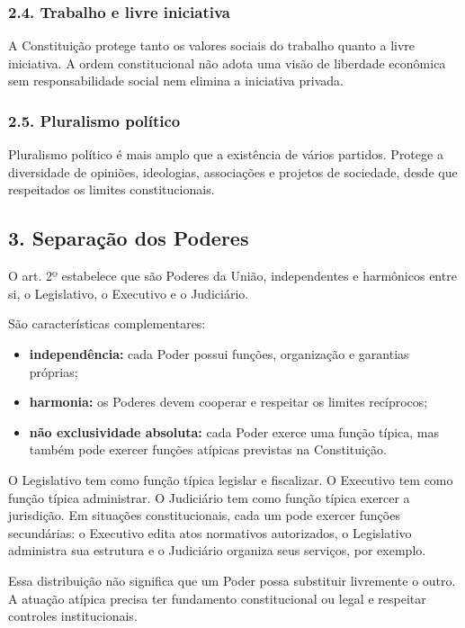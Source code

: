 \documentclass[11pt,a4paper]{article}
\begin{document}
\subsubsection*{2.4. Trabalho e livre iniciativa}

A Constituição protege tanto os valores sociais do trabalho quanto a livre iniciativa. A ordem constitucional não adota uma visão de liberdade econômica sem responsabilidade social nem elimina a iniciativa privada.

\subsubsection*{2.5. Pluralismo político}

Pluralismo político é mais amplo que a existência de vários partidos. Protege a diversidade de opiniões, ideologias, associações e projetos de sociedade, desde que respeitados os limites constitucionais.

\subsection*{3. Separação dos Poderes}

O art. 2º estabelece que são Poderes da União, independentes e harmônicos entre si, o Legislativo, o Executivo e o Judiciário.

São características complementares:

\begin{itemize}
  \item \textbf{independência:} cada Poder possui funções, organização e garantias próprias;
  \item \textbf{harmonia:} os Poderes devem cooperar e respeitar os limites recíprocos;
  \item \textbf{não exclusividade absoluta:} cada Poder exerce uma função típica, mas também pode exercer funções atípicas previstas na Constituição.
\end{itemize}

O Legislativo tem como função típica legislar e fiscalizar. O Executivo tem como função típica administrar. O Judiciário tem como função típica exercer a jurisdição. Em situações constitucionais, cada um pode exercer funções secundárias: o Executivo edita atos normativos autorizados, o Legislativo administra sua estrutura e o Judiciário organiza seus serviços, por exemplo.

Essa distribuição não significa que um Poder possa substituir livremente o outro. A atuação atípica precisa ter fundamento constitucional ou legal e respeitar controles institucionais.
\end{document}
